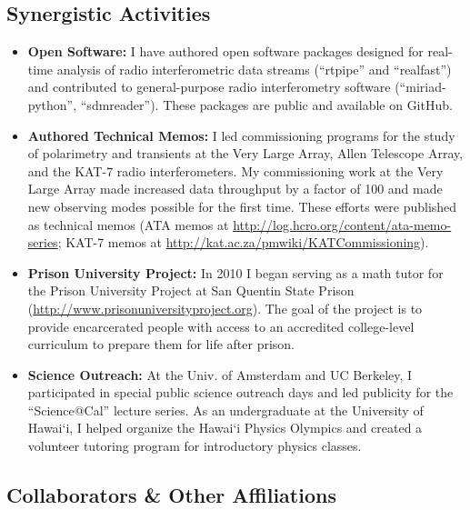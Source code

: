 \documentclass[11pt]{article}
\begin{document}
\subsection*{Synergistic Activities}

\begin{itemize}
 \item {\bf Open Software:} I have authored open software packages designed for real-time analysis of radio interferometric data streams (``rtpipe'' and ``realfast'') and contributed to general-purpose radio interferometry software (``miriad-python'', ``sdmreader''). These packages are public and available on GitHub.

 \item {\bf Authored Technical Memos:} I led commissioning programs for the study of polarimetry and transients at the Very Large Array, Allen Telescope Array, and the KAT-7 radio interferometers. My commissioning work at the Very Large Array made increased data throughput by a factor of 100 and made new observing modes possible for the first time. These efforts were published as technical memos (ATA memos at \url{http://log.hcro.org/content/ata-memo-series}; KAT-7 memos at \url{http://kat.ac.za/pmwiki/KATCommissioning}).

 \item {\bf Prison University Project:} In 2010 I began serving as a math tutor for the Prison University Project at San Quentin State Prison (\url{http://www.prisonuniversityproject.org}). The goal of the project is to provide encarcerated people with access to an accredited college-level curriculum to prepare them for life after prison.

 \item {\bf Science Outreach:} At the Univ. of Amsterdam and UC Berkeley, I participated in special public science outreach days and led publicity for the ``Science@Cal'' lecture series. As an undergraduate at the University of Hawai`i, I helped organize the Hawai`i Physics Olympics and created a volunteer tutoring program for introductory physics classes. 

\end{itemize}

\subsection*{Collaborators \& Other Affiliations}
\indent
\end{document}
